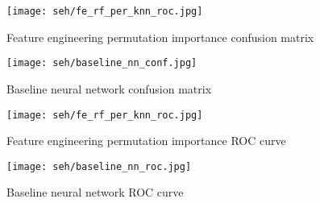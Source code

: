 \begin{figure}[H]
    \begin{center}
        \caption[]{Feature engineering permutation importance confusion matrix}
        \label{fig:seh_fe_rf_per_knn_conf}
        \texttt{[image: seh/fe\_rf\_per\_knn\_roc.jpg]}
    \end{center}
\end{figure}

\begin{figure}[H]
    \begin{center}
        \caption[]{Baseline neural network confusion matrix}
        \label{fig:seh_baseline_nn_conf}
        \texttt{[image: seh/baseline\_nn\_conf.jpg]}
    \end{center}

\end{figure}

\begin{figure}[H]
    \begin{center}
        \caption[]{Feature engineering permutation importance ROC curve}
        \label{fig:seh_fe_rf_per_knn_roc}
        \texttt{[image: seh/fe\_rf\_per\_knn\_roc.jpg]}
    \end{center}

\end{figure}

\begin{figure}[H]
    \begin{center}
        \caption[]{Baseline neural network ROC curve}
        \label{fig:seh_baseline_nn_roc}
        \texttt{[image: seh/baseline\_nn\_roc.jpg]}
    \end{center}
\end{figure}